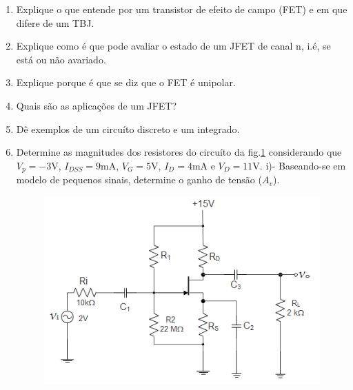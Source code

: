 \documentclass[12pt,a4paper,titlepage]{report}
\begin{document}
\begin{enumerate}
\item Explique o que entende por um transistor de efeito de campo (FET) e em que difere de um TBJ. 
\item Explique como \'e que pode avaliar o estado de um JFET de canal n, i.\'e, se est\'a ou n\~ao avariado.
\item Explique porque \'e que se diz que o FET \'e unipolar.
\item Quais s\~ao as aplica\c c\~oes de um JFET?
\item D\^e exemplos de um circu\'ito discreto e um integrado.
\item Determine as magnitudes dos resistores do circu\'ito da fig.\ref{a2} considerando que $V_p = -3$V, $I_{DSS}=9$mA, $V_G=5$V, $I_D=4$mA e $V_D=11$V. i)- Baseando-se em modelo de pequenos sinais, determine o ganho de tens\~ao ($A_v$).
  \begin{figure}[H]
\centering
\includegraphics[scale=0.7]{JFET1}
\caption{}
\label{a2}
\end{figure}


\end{enumerate}
\end{document}
